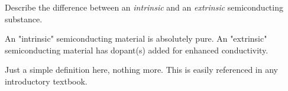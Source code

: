 

Describe the difference between an {\it intrinsic} and an {\it extrinsic} semiconducting substance.







An "intrinsic" semiconducting material is absolutely pure.  An "extrinsic" semiconducting material has dopant(s) added for enhanced conductivity.







Just a simple definition here, nothing more.  This is easily referenced in any introductory textbook.




